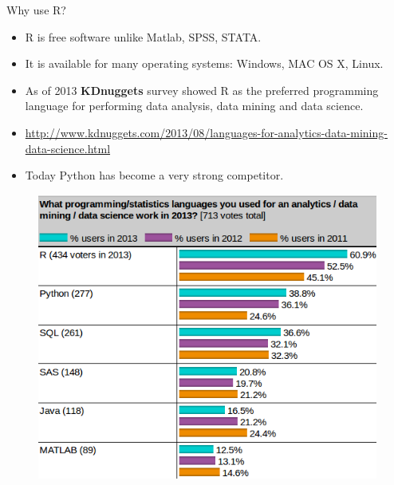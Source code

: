 \documentclass[handout]{beamer}
\begin{document}
\begin{frame}{Why use R?}


\scriptsize{
\begin{itemize}
 \item R is free software unlike Matlab, SPSS, STATA.
 \item It is available for many operating systems: Windows, MAC OS X, Linux.
 \item As of 2013 \textbf{KDnuggets} survey showed R as the preferred programming language for performing data analysis, data mining and data science.
 \item \url{http://www.kdnuggets.com/2013/08/languages-for-analytics-data-mining-data-science.html}
 \item Today Python has become a very strong competitor.


\end{itemize}

}

\begin{figure}[h!]
	\centering
	\includegraphics[scale=0.3]{pics/rpoll.png}
\end{figure}


\end{frame}
\end{document}
